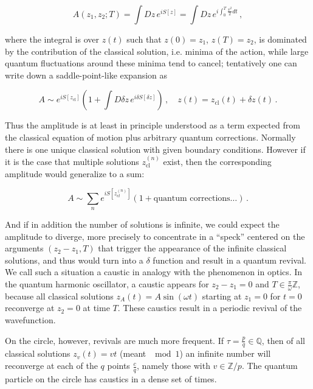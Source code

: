 \documentclass{article}
\begin{document}
\begin{equation}
    A(z_1,z_2;T) = \int Dz \,e^{iS[z]} = \int Dz \,e^{i \int_0^T \frac{v^2}{2} dt}\,,
\end{equation}

where the integral is over $z(t)$ such that $z(0) = z_1$, $z(T) = z_2$, is dominated by the contribution of the classical solution, i.e. minima of the action, while large quantum fluctuations around these minima tend to cancel; tentatively one can write down a saddle-point-like expansion as

\begin{equation}
    A \sim e^{iS[z_\text{cl}]} \left( 1 + \int D\delta z\, e^{ i \delta S[\delta z]} \right)\,,\quad z(t) = z_\text{cl}(t) + \delta z(t)\,.
\end{equation}

Thus the amplitude is at least in principle understood as a term expected from the classical equation of motion plus arbitrary quantum corrections. Normally there is one unique classical solution with given boundary conditions. However if it is the case that multiple solutions $z_\text{cl}^{(n)}$ exist, then the corresponding amplitude would generalize to a sum:

\begin{equation}
    A \sim \sum_n e^{i S[z_{cl}^{(n)}]} ( 1 + \text{quantum corrections} \ldots)\,.
\end{equation}

And if in addition the number of solutions is infinite, we could expect the amplitude to diverge, more precisely to concentrate in a ``speck'' centered on the arguments $(z_2-z_1,T)$ that trigger the appearance of the infinite classical solutions, and thus would turn into a $\delta$ function and result in a quantum revival. We call such a situation a caustic \cite{horie_quantum}\cite{boxpdf} in analogy with the phenomenon in optics. In the quantum harmonic oscillator, a caustic appears for $z_2 - z_1 = 0$ and $T \in \frac{\pi}{\omega} \mathbb{Z}$, because all classical solutions $z_A(t) = A \sin(\omega t)$ starting at $z_1 = 0$ for $t=0$ reconverge at $z_2 = 0$ at time $T$. These caustics result in a periodic revival of the wavefunction.

On the circle, however, revivals are much more frequent. If $\tau = \frac{p}{q} \in \mathbb{Q}$, then of all classical solutions $z_v(t) = vt$ (meant $\mod 1$) an infinite number will reconverge at each of the $q$ points $\frac{c}{q}$, namely those with $v \in \mathbb{Z}/p$. The quantum particle on the circle has caustics in a dense set of times.
\end{document}

